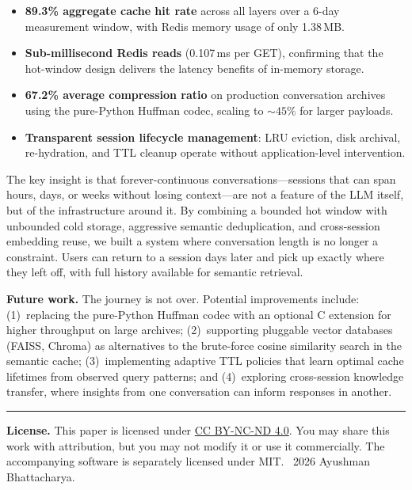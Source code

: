 \documentclass[conference]{IEEEtran}
\begin{document}
\begin{itemize}
\item \textbf{89.3\% aggregate cache hit rate} across all layers over a 6-day measurement window, with Redis memory usage of only 1.38\,MB.
\item \textbf{Sub-millisecond Redis reads} (0.107\,ms per GET), confirming that the hot-window design delivers the latency benefits of in-memory storage.
\item \textbf{67.2\% average compression ratio} on production conversation archives using the pure-Python Huffman codec, scaling to ${\sim}45\%$ for larger payloads.
\item \textbf{Transparent session lifecycle management}: LRU eviction, disk archival, re-hydration, and TTL cleanup operate without application-level intervention.
\end{itemize}

The key insight is that forever-continuous conversations---sessions that can span hours, days, or weeks without losing context---are not a feature of the LLM itself, but of the infrastructure around it. By combining a bounded hot window with unbounded cold storage, aggressive semantic deduplication, and cross-session embedding reuse, we built a system where conversation length is no longer a constraint. Users can return to a session days later and pick up exactly where they left off, with full history available for semantic retrieval.

\textbf{Future work.} The journey is not over. Potential improvements include: (1)~replacing the pure-Python Huffman codec with an optional C extension for higher throughput on large archives; (2)~supporting pluggable vector databases (FAISS, Chroma) as alternatives to the brute-force cosine similarity search in the semantic cache; (3)~implementing adaptive TTL policies that learn optimal cache lifetimes from observed query patterns; and (4)~exploring cross-session knowledge transfer, where insights from one conversation can inform responses in another.

\vspace{0.5em}
\noindent\rule{\columnwidth}{0.4pt}
{\footnotesize \textbf{License.} This paper is licensed under \href{https://creativecommons.org/licenses/by-nc-nd/4.0/}{CC BY-NC-ND 4.0}. You may share this work with attribution, but you may not modify it or use it commercially. The accompanying software is separately licensed under MIT. \textcopyright~2026 Ayushman Bhattacharya.}
\end{document}
